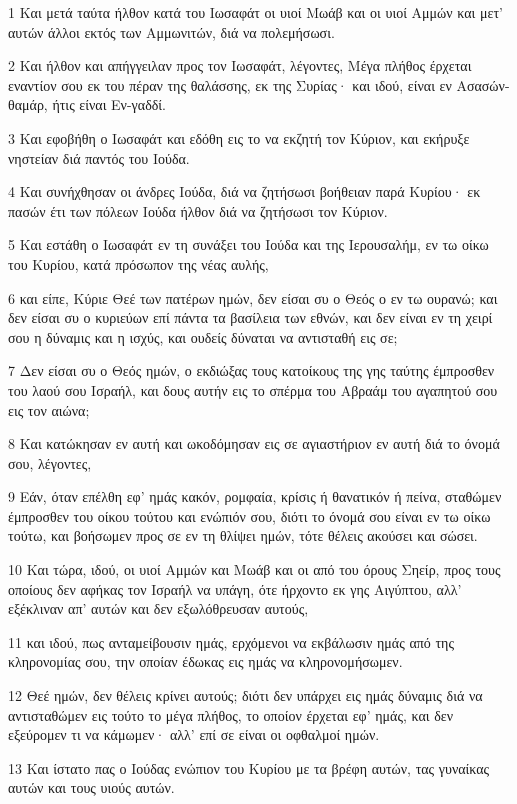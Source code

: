 \par 1 Και μετά ταύτα ήλθον κατά του Ιωσαφάτ οι υιοί Μωάβ και οι υιοί Αμμών και μετ' αυτών άλλοι εκτός των Αμμωνιτών, διά να πολεμήσωσι.
\par 2 Και ήλθον και απήγγειλαν προς τον Ιωσαφάτ, λέγοντες, Μέγα πλήθος έρχεται εναντίον σου εκ του πέραν της θαλάσσης, εκ της Συρίας· και ιδού, είναι εν Ασασών-θαμάρ, ήτις είναι Εν-γαδδί.
\par 3 Και εφοβήθη ο Ιωσαφάτ και εδόθη εις το να εκζητή τον Κύριον, και εκήρυξε νηστείαν διά παντός του Ιούδα.
\par 4 Και συνήχθησαν οι άνδρες Ιούδα, διά να ζητήσωσι βοήθειαν παρά Κυρίου· εκ πασών έτι των πόλεων Ιούδα ήλθον διά να ζητήσωσι τον Κύριον.
\par 5 Και εστάθη ο Ιωσαφάτ εν τη συνάξει του Ιούδα και της Ιερουσαλήμ, εν τω οίκω του Κυρίου, κατά πρόσωπον της νέας αυλής,
\par 6 και είπε, Κύριε Θεέ των πατέρων ημών, δεν είσαι συ ο Θεός ο εν τω ουρανώ; και δεν είσαι συ ο κυριεύων επί πάντα τα βασίλεια των εθνών, και δεν είναι εν τη χειρί σου η δύναμις και η ισχύς, και ουδείς δύναται να αντισταθή εις σε;
\par 7 Δεν είσαι συ ο Θεός ημών, ο εκδιώξας τους κατοίκους της γης ταύτης έμπροσθεν του λαού σου Ισραήλ, και δους αυτήν εις το σπέρμα του Αβραάμ του αγαπητού σου εις τον αιώνα;
\par 8 Και κατώκησαν εν αυτή και ωκοδόμησαν εις σε αγιαστήριον εν αυτή διά το όνομά σου, λέγοντες,
\par 9 Εάν, όταν επέλθη εφ' ημάς κακόν, ρομφαία, κρίσις ή θανατικόν ή πείνα, σταθώμεν έμπροσθεν του οίκου τούτου και ενώπιόν σου, διότι το όνομά σου είναι εν τω οίκω τούτω, και βοήσωμεν προς σε εν τη θλίψει ημών, τότε θέλεις ακούσει και σώσει.
\par 10 Και τώρα, ιδού, οι υιοί Αμμών και Μωάβ και οι από του όρους Σηείρ, προς τους οποίους δεν αφήκας τον Ισραήλ να υπάγη, ότε ήρχοντο εκ γης Αιγύπτου, αλλ' εξέκλιναν απ' αυτών και δεν εξωλόθρευσαν αυτούς,
\par 11 και ιδού, πως ανταμείβουσιν ημάς, ερχόμενοι να εκβάλωσιν ημάς από της κληρονομίας σου, την οποίαν έδωκας εις ημάς να κληρονομήσωμεν.
\par 12 Θεέ ημών, δεν θέλεις κρίνει αυτούς; διότι δεν υπάρχει εις ημάς δύναμις διά να αντισταθώμεν εις τούτο το μέγα πλήθος, το οποίον έρχεται εφ' ημάς, και δεν εξεύρομεν τι να κάμωμεν· αλλ' επί σε είναι οι οφθαλμοί ημών.
\par 13 Και ίστατο πας ο Ιούδας ενώπιον του Κυρίου με τα βρέφη αυτών, τας γυναίκας αυτών και τους υιούς αυτών.
